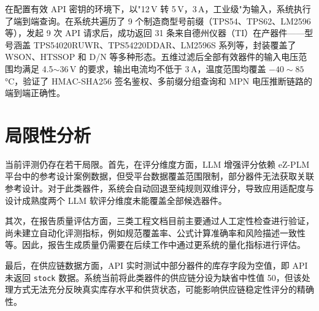在配置有效 API 密钥的环境下，以"12\,V 转 5\,V，3\,A，工业级"为输入，系统执行了端到端查询。在系统共遍历了 9 个制造商型号前缀（TPS54、TPS62、LM2596 等），发起 9 次 API 请求后，成功返回 31 条来自德州仪器（TI）在产器件——型号涵盖 TPS54020RUWR、TPS54220DDAR、LM2596S 系列等，封装覆盖了 WSON、HTSSOP 和 D/N 等多种形态。五维过滤后全部有效器件的输入电压范围均满足 4.5$\sim$36\,V 的要求，输出电流均不低于 3\,A，温度范围均覆盖 $-40\sim85\;$°C，验证了 HMAC-SHA256 签名鉴权、多前缀分组查询和 MPN 电压推断链路的端到端正确性。

\section{局限性分析}

当前评测仍存在若干局限。首先，在评分维度方面，LLM 增强评分依赖 eZ-PLM 平台中的参考设计案例数据，但受平台数据覆盖范围限制，部分器件无法获取关联参考设计。对于此类器件，系统会自动回退至纯规则双维评分，导致应用适配度与设计成熟度两个 LLM 软评分维度未能覆盖全部候选器件。

其次，在报告质量评估方面，三类工程文档目前主要通过人工定性检查进行验证，尚未建立自动化评测指标，例如规范覆盖率、公式计算准确率和风险描述一致性等。因此，报告生成质量仍需要在后续工作中通过更系统的量化指标进行评估。

最后，在供应链数据方面，API 实时测试中部分器件的库存字段为空值，即 API 未返回 \texttt{stock} 数据。系统当前将此类器件的供应链分设为缺省中性值 50，但该处理方式无法充分反映真实库存水平和供货状态，可能影响供应链稳定性评分的精确性。
